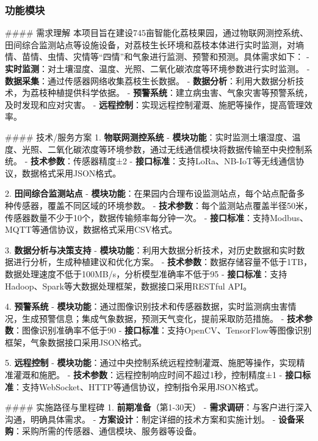 \documentclass[12pt,a4paper]{article}
\begin{document}
\begin{itemize}
\begin{itemize}
\begin{itemize}
\begin{itemize}
\begin{itemize}
\begin{itemize}
\begin{itemize}
\begin{itemize}
\begin{itemize}
\begin{itemize}
\begin{itemize}
\subsubsection{功能模块}


#### 需求理解
本项目旨在建设745亩智能化荔枝果园，通过物联网测控系统、田间综合监测站点等设施设备，对荔枝生长环境和荔枝本体进行实时监测，对墒情、苗情、虫情、灾情等“四情”和气象进行监测、预警和预测。具体需求如下：
- \textbf{实时监测}：对土壤湿度、温度、光照、二氧化碳浓度等环境参数进行实时监测。
- \textbf{数据采集}：通过传感器网络收集荔枝生长数据。
- \textbf{数据分析}：利用大数据分析技术，为荔枝种植提供科学依据。
- \textbf{预警系统}：建立病虫害、气象灾害等预警系统，及时发现和应对灾害。
- \textbf{远程控制}：实现远程控制灌溉、施肥等操作，提高管理效率。

#### 技术/服务方案
1. \textbf{物联网测控系统}
- \textbf{模块功能}：实时监测土壤湿度、温度、光照、二氧化碳浓度等环境参数，通过无线通信模块将数据传输至中央控制系统。
- \textbf{技术参数}：传感器精度±2%
- \textbf{接口标准}：支持LoRa、NB-IoT等无线通信协议，数据格式采用JSON格式。

2. \textbf{田间综合监测站点}
- \textbf{模块功能}：在果园内合理布设监测站点，每个站点配备多种传感器，覆盖不同区域的环境参数。
- \textbf{技术参数}：每个监测站点覆盖半径50米，传感器数量不少于10个，数据传输频率每分钟一次。
- \textbf{接口标准}：支持Modbus、MQTT等通信协议，数据格式采用CSV格式。

3. \textbf{数据分析与决策支持}
- \textbf{模块功能}：利用大数据分析技术，对历史数据和实时数据进行分析，生成种植建议和优化方案。
- \textbf{技术参数}：数据存储容量不低于1TB，数据处理速度不低于100MB/s，分析模型准确率不低于95%
- \textbf{接口标准}：支持Hadoop、Spark等大数据处理框架，数据接口采用RESTful API。

4. \textbf{预警系统}
- \textbf{模块功能}：通过图像识别技术和传感器数据，实时监测病虫害情况，生成预警信息；集成气象数据，预测天气变化，提前采取防范措施。
- \textbf{技术参数}：图像识别准确率不低于90%
- \textbf{接口标准}：支持OpenCV、TensorFlow等图像识别框架，气象数据接口采用JSON格式。

5. \textbf{远程控制}
- \textbf{模块功能}：通过中央控制系统远程控制灌溉、施肥等操作，实现精准灌溉和施肥。
- \textbf{技术参数}：远程控制响应时间不超过1秒，控制精度±1%
- \textbf{接口标准}：支持WebSocket、HTTP等通信协议，控制指令采用JSON格式。

#### 实施路径与里程碑
1. \textbf{前期准备}（第1-30天）
- \textbf{需求调研}：与客户进行深入沟通，明确具体需求。
- \textbf{方案设计}：制定详细的技术方案和实施计划。
- \textbf{设备采购}：采购所需的传感器、通信模块、服务器等设备。


\end{itemize}
\end{itemize}
\end{itemize}
\end{itemize}
\end{itemize}
\end{itemize}
\end{itemize}
\end{itemize}
\end{itemize}
\end{itemize}
\end{itemize}
\end{document}
